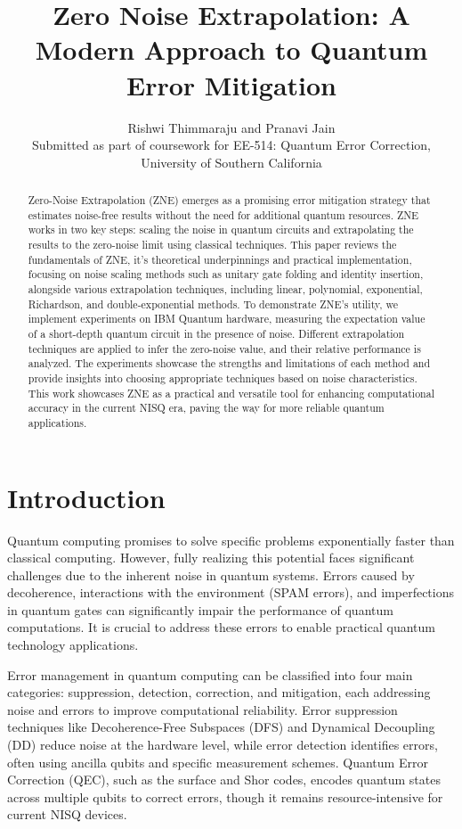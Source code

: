 \documentclass[12pt]{article}
\title{Zero Noise Extrapolation: A Modern Approach to Quantum Error Mitigation}
\author{
    \large Rishwi Thimmaraju and Pranavi Jain\\
    \small  Submitted as part of coursework for EE-514: Quantum Error Correction,\\
    \small University of Southern California
}
\begin{document}
\maketitle

\begin{abstract}
Zero-Noise Extrapolation (ZNE) emerges as a promising error mitigation strategy that estimates noise-free results without the need for additional quantum resources. ZNE works in two key steps: scaling the noise in quantum circuits and extrapolating the results to the zero-noise limit using classical techniques. This paper reviews the fundamentals of ZNE, it's theoretical underpinnings and practical implementation, focusing on noise scaling methods such as unitary gate folding and identity insertion, alongside various extrapolation techniques, including linear, polynomial, exponential, Richardson, and double-exponential methods. To demonstrate ZNE’s utility, we implement experiments on IBM Quantum hardware, measuring the expectation value of a short-depth quantum circuit in the presence of noise. Different extrapolation techniques are applied to infer the zero-noise value, and their relative performance is analyzed. The experiments showcase the strengths and limitations of each method and provide insights into choosing appropriate techniques based on noise characteristics. This work showcases ZNE as a practical and versatile tool for enhancing computational accuracy in the current NISQ era, paving the way for more reliable quantum applications.
\end{abstract}

\newpage

\tableofcontents

\newpage

\section{Introduction}
Quantum computing promises to solve specific problems exponentially faster than classical computing. However, fully realizing this potential faces significant challenges due to the inherent noise in quantum systems. Errors caused by decoherence, interactions with the environment (SPAM errors), and imperfections in quantum gates can significantly impair the performance of quantum computations. It is crucial to address these errors to enable practical quantum technology applications. 

Error management in quantum computing can be classified into four main categories: suppression, detection, correction, and mitigation, each addressing noise and errors to improve computational reliability. Error suppression techniques like Decoherence-Free Subspaces (DFS) and Dynamical Decoupling (DD) reduce noise at the hardware level, while error detection identifies errors, often using ancilla qubits and specific measurement schemes. Quantum Error Correction (QEC), such as the surface and Shor codes, encodes quantum states across multiple qubits to correct errors, though it remains resource-intensive for current NISQ devices.
\end{document}
